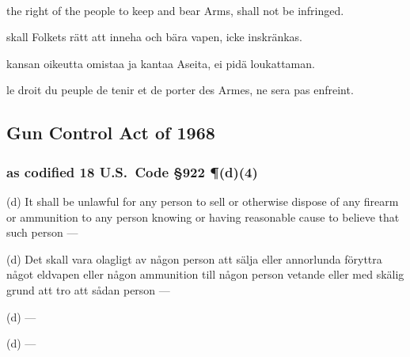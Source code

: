 \documentclass[a4paper,landscape,12pt]{article}
\begin{document}
~

\begin{minipage}[t]{0.22\textwidth}
the right of the people to keep and bear Arms, shall not be infringed.
\end{minipage}\textwidth
\begin{minipage}[t]{0.22\textwidth}
skall Folkets rätt att inneha och bära vapen, icke inskränkas.
\end{minipage}\textwidth
\begin{minipage}[t]{0.22\textwidth}
kansan oikeutta omistaa ja kantaa Aseita, ei pidä loukattaman.
\end{minipage}\textwidth
\begin{minipage}[t]{0.22\textwidth}
le droit du peuple de tenir et de porter des Armes, ne sera pas enfreint.
\end{minipage}

\subsection*{Gun Control Act of 1968}

\subsubsection*{as codified 18 U.S.~Code \S 922 \P(d)(4)}

\begin{minipage}[t]{0.22\textwidth}
(d) It shall be unlawful for any person to sell or otherwise dispose of any firearm or ammunition to any person knowing or having reasonable cause to believe that such person ---
\end{minipage}\textwidth
\begin{minipage}[t]{0.22\textwidth}
(d) Det skall vara olagligt av någon person att sälja eller annorlunda föryttra något eldvapen eller någon ammunition till någon person vetande eller med skälig grund att tro att sådan person ---
\end{minipage}\textwidth
\begin{minipage}[t]{0.22\textwidth}
(d) ---
\end{minipage}\textwidth
\begin{minipage}[t]{0.22\textwidth}
(d) ---
\end{minipage}
\end{document}
